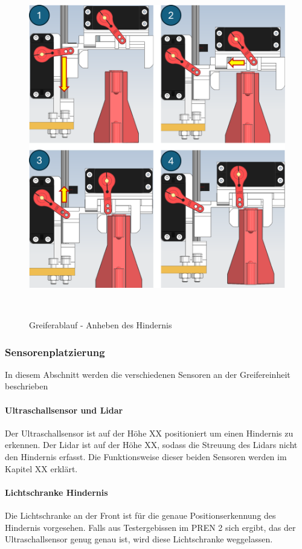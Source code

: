 \documentclass[main.tex]{subfiles} %
\begin{document}
\begin{figure}[H]
    \centering
    \includegraphics[width=1\textwidth]{Greiferablauf.png}
    \caption{Greiferablauf - Anheben des Hindernis}~\label{fig:Greiferablauf}
\end{figure}


\subsubsection*{Sensorenplatzierung}

In diesem Abschnitt werden die verschiedenen Sensoren an der Greifereinheit beschrieben

\paragraph{Ultraschallsensor und Lidar}
Der Ultraschallsensor ist auf der Höhe XX positioniert um einen Hindernis zu erkennen.
Der Lidar ist auf der Höhe XX, sodass die Streuung des Lidars nicht den Hindernis erfasst.
Die Funktionsweise dieser beiden Sensoren werden im Kapitel XX erklärt.

\paragraph{Lichtschranke Hindernis}
Die Lichtschranke an der Front ist für die genaue Positionserkennung des Hindernis vorgesehen.
Falls aus Testergebissen im PREN 2 sich ergibt, das der Ultraschallsensor genug genau ist, wird diese Lichtschranke weggelassen.
\end{document}
